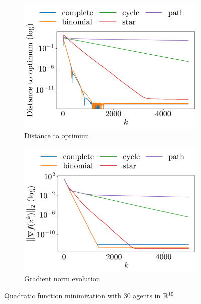\documentclass[a4paper,11pt,oneside]{book}
\begin{document}
\begin{figure}[h!]
      \centering
      \begin{subfigure}[h]{0.42\linewidth}
            \centering
            \includegraphics[width=\linewidth]{./figs/quadratic/30_15/distance.pdf} 
            \caption{Distance to optimum}
      \end{subfigure}
      \hfill
      \begin{subfigure}[h]{0.42\linewidth}
            \centering
            \includegraphics[width=\linewidth]{./figs/quadratic/30_15/gradient.pdf} 
            \caption{Gradient norm evolution}
      \end{subfigure}
      \caption{Quadratic function minimization with $30$ agents in ${\mathbb{R}}^{15}$}
      \label{fig:quadratic_30_15}
\end{figure}
\end{document}
